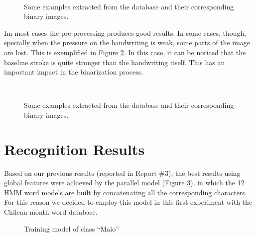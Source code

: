 \documentclass{article}[14pt, oneside, a4paper, times]
\begin{document}
 \begin {figure} [htb]
    \centering
    \mbox
        {
        \quad 
        \quad 
        }
       \mbox
        {
        \quad 
        \quad 
        }
       
    \caption{Some examples extracted from the database and their corresponding binary images.}
    \label{samples:fig}
\end{figure}

Im most cases the pre-processing produces good results. In some cases, though, specially when the pressure on the handwriting is weak, some parts of the image are lost. This is exemplified in Figure \ref{missing:fig}. In this case, it can be noticed that the baseline stroke is quite stronger than the handwriting itself. This has an important impact in the binarization process. 


 \begin {figure} [htb]
    \centering
    \mbox
        {
        \quad 
        }
         
    \caption{Some examples extracted from the database and their corresponding binary images.}
    \label{missing:fig}
\end{figure}

\section{Recognition Results}

Based on our previous results (reported in Report \#3), the best results using global features 
were achieved by the parallel model (Figure \ref{paralel-models:fig}), in which the 12 HMM word models are built by concatenating all the corresponding characters. For this reason we decided to employ this model in this first experiment with the Chilean month word database. 

\begin{figure}[htbp]
   \centering
   \caption{Training model of class ``Maio''}
   \label{paralel-models:fig}
\end{figure}
\end{document}
